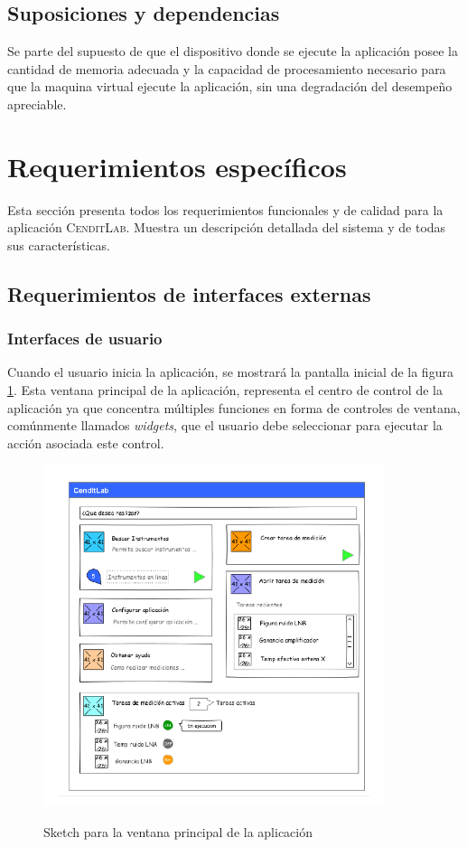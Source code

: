 \documentclass[paper=a4,oneside,fontsize=12pt]{article}
\newcommand{\AppName}{\textsc{CenditLab}\xspace}
\begin{document}
	\subsection{Suposiciones y dependencias}	
	
	Se parte del supuesto de que el dispositivo donde se ejecute la aplicación posee la cantidad de memoria adecuada y la capacidad de procesamiento necesario para que la maquina virtual ejecute la aplicación, sin una degradación del desempeño apreciable.
	
	\section{Requerimientos específicos}
	
	Esta sección presenta todos los requerimientos funcionales y de calidad para la aplicación \AppName. Muestra un descripción detallada del sistema y de todas sus características.
	
	\subsection{Requerimientos de interfaces externas}
	
	\subsubsection{Interfaces de usuario}
	
	Cuando el usuario inicia la aplicación, se mostrará la pantalla inicial de la figura \ref{Fig:MainWndowUI}. Esta ventana principal de la aplicación, representa el centro de control de la aplicación ya que concentra múltiples funciones en forma de controles de ventana, comúnmente llamados \emph{widgets}, que el usuario debe seleccionar para ejecutar la acción asociada este control. 
	
	\begin{figure}[]
		\centering 
		\includegraphics[width=10cm]{Imagenes/MainWindowUI.pdf}
		\label{Fig:MainWndowUI} 
		\caption{Sketch para la ventana principal de la aplicación}
	\end{figure}		
	
\end{document}
